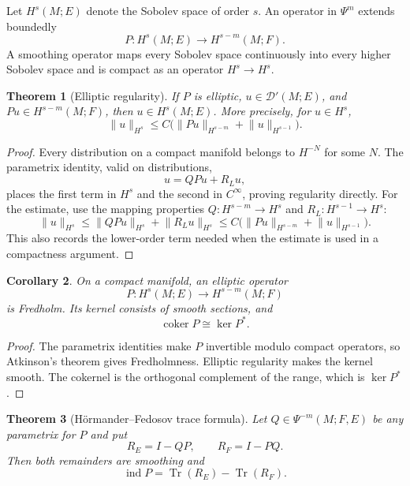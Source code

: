 \documentclass[11pt,oneside,reqno]{book}
\DeclareMathOperator{\Tr}{Tr}
\theoremstyle{plain}
\newtheorem{theorem}{Theorem}[chapter]
\newtheorem{corollary}[theorem]{Corollary}
\theoremstyle{definition}
\theoremstyle{remark}
\begin{document}
Let \(H^s(M;E)\) denote the Sobolev space of order \(s\). An operator in
\(\Psi^m\) extends boundedly
\[
 P:H^s(M;E)\longrightarrow H^{s-m}(M;F).
\]
A smoothing operator maps every Sobolev space continuously into every
higher Sobolev space and is compact as an operator \(H^s\to H^s\).

\begin{theorem}[Elliptic regularity]
If \(P\) is elliptic, \(u\in\mathcal D'(M;E)\), and
\(Pu\in H^{s-m}(M;F)\), then \(u\in H^s(M;E)\). More precisely, for
\(u\in H^s\),
\[
 \lVert u\rVert_{H^s}
 \leq C\bigl(\lVert Pu\rVert_{H^{s-m}}+\lVert u\rVert_{H^{s-1}}\bigr).
\]
\end{theorem}

\begin{proof}
Every distribution on a compact manifold belongs to \(H^{-N}\) for some
\(N\).  The parametrix identity, valid on distributions,
\[
 u=QPu+R_Lu,
\]
places the first term in \(H^s\) and the second in \(C^\infty\), proving
regularity directly.  For the estimate, use the mapping properties
\(Q:H^{s-m}\to H^s\) and
\(R_L:H^{s-1}\to H^s\):
\[
 \lVert u\rVert_{H^s}
 \leq \lVert QPu\rVert_{H^s}+\lVert R_Lu\rVert_{H^s}
 \leq C\bigl(\lVert Pu\rVert_{H^{s-m}}
                    +\lVert u\rVert_{H^{s-1}}\bigr).
\]
This also records the lower-order term needed when the estimate is used in
a compactness argument.
\end{proof}

\begin{corollary}
On a compact manifold, an elliptic operator
\[
 P:H^s(M;E)\longrightarrow H^{s-m}(M;F)
\]
is Fredholm. Its kernel consists of smooth sections, and
\[
 \operatorname{coker}P\cong\ker P^*.
\]
\end{corollary}

\begin{proof}
The parametrix identities make \(P\) invertible modulo compact operators,
so Atkinson's theorem gives Fredholmness. Elliptic regularity makes the
kernel smooth. The cokernel is the orthogonal complement of the range,
which is \(\ker P^*\).
\end{proof}

\begin{theorem}[H\"ormander--Fedosov trace formula]
Let \(Q\in\Psi^{-m}(M;F,E)\) be any parametrix for \(P\) and put
\[
 R_E=I-QP,\qquad R_F=I-PQ.
\]
Then both remainders are smoothing and
\[
 \operatorname{ind}P=\Tr(R_E)-\Tr(R_F).
\]
\end{theorem}
\end{document}
